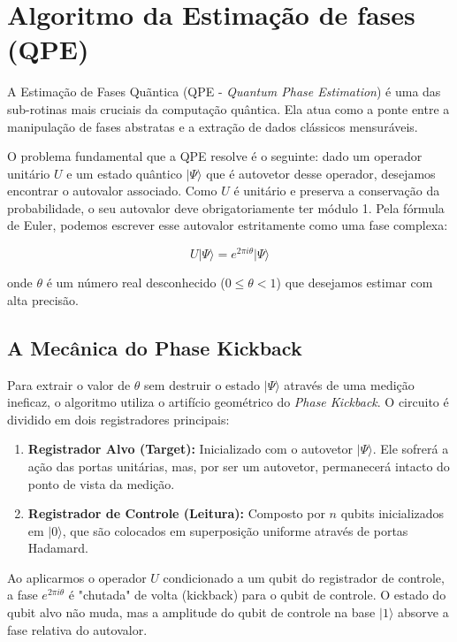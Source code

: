 \documentclass[12pt, a4paper]{article}
\newcommand{\ket}[1]{\lvert #1 \rangle}
\begin{document}
\section{Algoritmo da Estimação de fases (QPE)}

A Estimação de Fases Quãntica (QPE - \textit{Quantum Phase Estimation}) é uma das sub-rotinas mais cruciais da computação quântica. Ela atua como a ponte entre a manipulação de fases abstratas e a extração de dados clássicos mensuráveis.

O problema fundamental que a QPE resolve é o seguinte: dado um operador unitário $U$ e um estado quântico $\ket{\Psi}$ que é autovetor desse operador, desejamos encontrar o autovalor associado. Como $U$ é unitário e preserva a conservação da probabilidade, o seu autovalor deve obrigatoriamente ter módulo 1. Pela fórmula de Euler, podemos escrever esse autovalor estritamente como uma fase complexa:

\begin{equation}
    U\ket{\Psi} = e^{2\pi i \theta}\ket{\Psi}
\end{equation}

onde $\theta$ é um número real desconhecido ($0 \le \theta < 1$) que desejamos estimar com alta precisão.

\subsection{A Mecânica do Phase Kickback}

Para extrair o valor de $\theta$ sem destruir o estado $\ket{\Psi}$ através de uma medição ineficaz, o algoritmo utiliza o artifício geométrico do \textit{Phase Kickback}. O circuito é dividido em dois registradores principais:

\begin{enumerate}
    \item \textbf{Registrador Alvo (Target):} Inicializado com o autovetor $\ket{\Psi}$. Ele sofrerá a ação das portas unitárias, mas, por ser um autovetor, permanecerá intacto do ponto de vista da medição.
    \item \textbf{Registrador de Controle (Leitura):} Composto por $n$ qubits inicializados em $\ket{0}$, que são colocados em superposição uniforme através de portas Hadamard.
\end{enumerate}

Ao aplicarmos o operador $U$ condicionado a um qubit do registrador de controle, a fase $e^{2\pi i \theta}$ é "chutada" de volta (kickback) para o qubit de controle. O estado do qubit alvo não muda, mas a amplitude do qubit de controle na base $\ket{1}$ absorve a fase relativa do autovalor.
\end{document}
